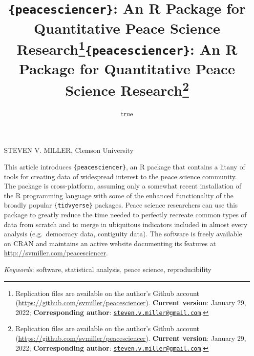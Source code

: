 \documentclass[
  11pt,
]{article}
\title{\texttt{\{peacesciencer\}}: An R Package for Quantitative Peace Science Research\thanks{Replication files are available on the author's Github account (\url{https://github.com/svmiller/peacesciencer}). \textbf{Current version}: January 29, 2022; \textbf{Corresponding author}: \href{mailto:steven.v.miller@gmail.com}{\nolinkurl{steven.v.miller@gmail.com}}.}}
\author{true}
\date{}
\title{\texttt{\{peacesciencer\}}: An R Package for Quantitative Peace Science Research\thanks{Replication files are available on the author's Github account (\url{https://github.com/svmiller/peacesciencer}). \textbf{Current version}: January 29, 2022; \textbf{Corresponding author}: \href{mailto:steven.v.miller@gmail.com}{\nolinkurl{steven.v.miller@gmail.com}}.}  }
\date{}
\renewenvironment{abstract}
 {{%
    \setlength{\leftmargin}{0mm}
    \setlength{\rightmargin}{\leftmargin}%
  }%
  \relax}
 {\endlist}
\begin{document}



{%
\setlength{\parindent}{0pt}
\thispagestyle{plain}
{%
\maketitle  %

}




{
   \vskip 13.5pt\relax \normalsize\fontsize{11}{12}
   \MakeUppercase{Steven V. Miller}, \small{Clemson University}   

}

}








\begin{abstract}


    \vskip 8.5pt %

\noindent \small{This article introduces \texttt{\{peacesciencer\}}, an R package that contains a litany of tools for creating data of widespread interest to the peace science community. The package is cross-platform, assuming only a somewhat recent installation of the R programming language with some of the enhanced functionality of the broadly popular \texttt{\{tidvyerse\}} packages. Peace science researchers can use this package to greatly reduce the time needed to perfectly recreate common types of data from scratch and to merge in ubiquitous indicators included in almost every analysis (e.g.~democracy data, contiguity data). The software is freely available on CRAN and maintains an active website documenting its features at \url{http://svmiller.com/peacesciencer}.}


\vskip 8.5pt \noindent \emph{Keywords}: software, statistical analysis, peace science, reproducibility \par




\end{abstract}
\end{document}
